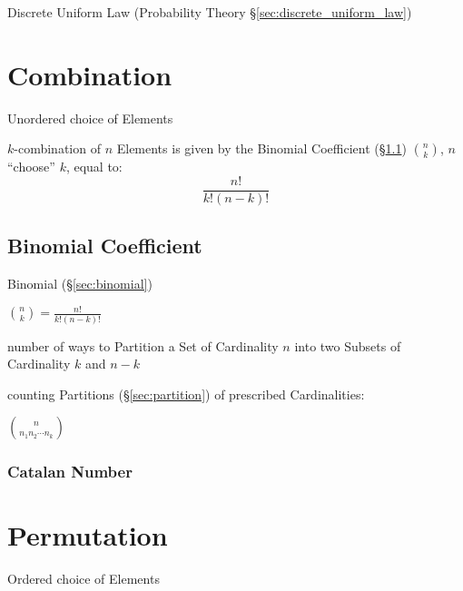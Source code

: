 \fist Discrete Uniform Law (Probability Theory \S\ref{sec:discrete_uniform_law})



\section{Combination}\label{sec:combination}

Unordered choice of Elements

$k$-combination of $n$ Elements is given by the Binomial Coefficient
(\S\ref{sec:binomial_coefficient}) $\binom{n}{k}$, $n$ ``choose'' $k$, equal to:
\[
  \frac{n!}{k!(n - k)!}
\]



\subsection{Binomial Coefficient}\label{sec:binomial_coefficient}

Binomial (\S\ref{sec:binomial})

$\binom{n}{k} = \frac{n!}{k!(n - k)!}$

number of ways to Partition a Set of Cardinality $n$ into two Subsets of
Cardinality $k$ and $n-k$

counting Partitions (\S\ref{sec:partition}) of prescribed Cardinalities:

$\binom{n}{n_1 n_2 \cdots n_k}$



\subsubsection{Catalan Number}\label{sec:catalan_number}



\section{Permutation}\label{sec:permutation}

Ordered choice of Elements


